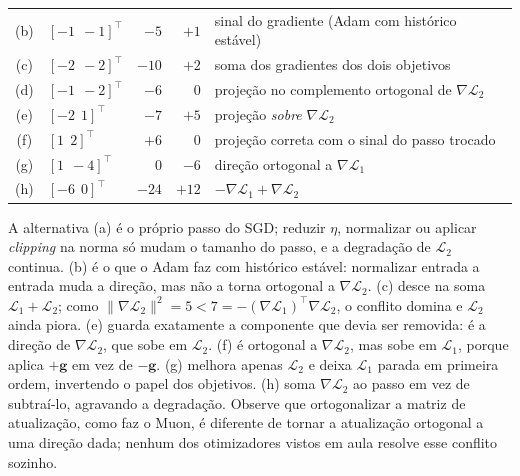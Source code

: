 \documentclass{dlproblemset}
\begin{document}
\begin{enumerate}[1)]
\begin{center}
\begin{tabular}{clrrl}
    (b) & $[-1\ \ -1]^{\top}$ & $-5$ & $+1$ & sinal do gradiente (Adam com histórico estável) \\
    (c) & $[-2\ \ -2]^{\top}$ & $-10$ & $+2$ & soma dos gradientes dos dois objetivos \\
    (d) & $[-1\ \ -2]^{\top}$ & $-6$ & $0$ & projeção no complemento ortogonal de $\nabla\mathcal{L}_2$ \\
    (e) & $[-2\ \ 1]^{\top}$ & $-7$ & $+5$ & projeção \emph{sobre} $\nabla\mathcal{L}_2$ \\
    (f) & $[1\ \ 2]^{\top}$ & $+6$ & $0$ & projeção correta com o sinal do passo trocado \\
    (g) & $[1\ \ -4]^{\top}$ & $0$ & $-6$ & direção ortogonal a $\nabla\mathcal{L}_1$ \\
    (h) & $[-6\ \ 0]^{\top}$ & $-24$ & $+12$ & $-\nabla\mathcal{L}_1 + \nabla\mathcal{L}_2$ \\
    \end{tabular}
    \end{center}
    A alternativa (a) é o próprio passo do SGD; reduzir $\eta$, normalizar ou aplicar \textit{clipping} na norma só mudam o tamanho do passo, e a degradação de $\mathcal{L}_2$ continua. (b) é o que o Adam faz com histórico estável: normalizar entrada a entrada muda a direção, mas não a torna ortogonal a $\nabla\mathcal{L}_2$. (c) desce na soma $\mathcal{L}_1 + \mathcal{L}_2$; como $\|\nabla\mathcal{L}_2\|^2 = 5 < 7 = -(\nabla\mathcal{L}_1)^{\top}\nabla\mathcal{L}_2$, o conflito domina e $\mathcal{L}_2$ ainda piora. (e) guarda exatamente a componente que devia ser removida: é a direção de $\nabla\mathcal{L}_2$, que sobe em $\mathcal{L}_2$. (f) é ortogonal a $\nabla\mathcal{L}_2$, mas sobe em $\mathcal{L}_1$, porque aplica $+\mathbf{g}$ em vez de $-\mathbf{g}$. (g) melhora apenas $\mathcal{L}_2$ e deixa $\mathcal{L}_1$ parada em primeira ordem, invertendo o papel dos objetivos. (h) soma $\nabla\mathcal{L}_2$ ao passo em vez de subtraí-lo, agravando a degradação. Observe que ortogonalizar a matriz de atualização, como faz o Muon, é diferente de tornar a atualização ortogonal a uma direção dada; nenhum dos otimizadores vistos em aula resolve esse conflito sozinho.


\end{enumerate}
\end{document}
